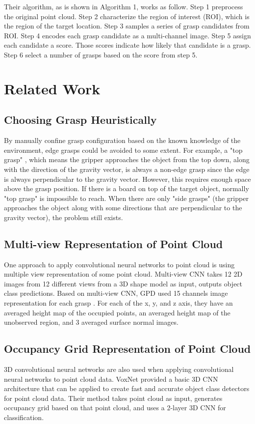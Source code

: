 \documentclass[letterpaper]{article} %
\begin{document}
Their algorithm, as is shown in Algorithm 1, works as follow. Step 1 preprocess the original point cloud. Step 2 characterize the region of interest (ROI), which is the region of the target location. Step 3 samples a series of grasp candidates from ROI. Step 4 encodes each grasp candidate as a multi-channel image. Step 5 assign each candidate a score. Those scores indicate how likely that candidate is a grasp. Step 6 select a number of grasps based on the score from step 5.


\section{Related Work}
\subsection{Choosing Grasp Heuristically}
By manually confine grasp configuration based on the known knowledge of the environment, edge grasps could be avoided to some extent. For example, a "top grasp" \cite{RN8}, which means the gripper approaches the object from the top down, along with the direction of the gravity vector, is always a non-edge grasp since the edge is always perpendicular to the gravity vector. However, this requires enough space above the grasp position. If there is a board on top of the target object, normally "top grasp" is impossible to reach. When there are only "side grasps" (the gripper approaches the object along with some directions that are perpendicular to the gravity vector), the problem still exists.

\subsection{Multi-view Representation of Point Cloud}
One approach to apply convolutional neural networks to point cloud is using multiple view representation of some point cloud. Multi-view CNN \cite{RN7} takes 12 2D images from 12 different views from a 3D shape model as input, outputs object class predictions.
Based on multi-view CNN, GPD used 15 channels image representation for each grasp \cite{RN6}. For each of the x, y, and z axis, they have an averaged height map of the occupied points, an averaged height map of the unobserved region, and 3 averaged surface normal images.

\subsection{Occupancy Grid Representation of Point Cloud}
3D convolutional neural networks are also used when applying convolutional neural networks to point cloud data. VoxNet \cite{RN4} provided a basic 3D CNN architecture that can be applied to create fast and accurate object class detectors for point cloud data. Their method takes point cloud as input, generates occupancy grid based on that point cloud, and uses a 2-layer 3D CNN for classification.
\end{document}
